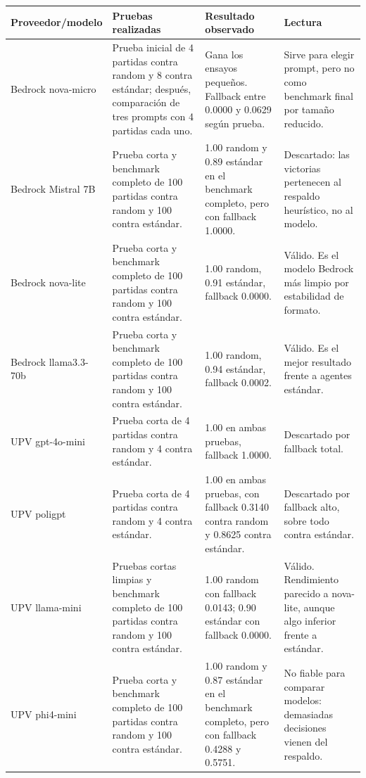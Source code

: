 ﻿\documentclass[10pt,a4paper]{article}
\renewcommand{\arraystretch}{1.08}
\begin{document}
\begin{table}[H]
\centering
\scriptsize
\renewcommand{\arraystretch}{1.16}
\setlength{\tabcolsep}{3pt}
\begin{tabular}{L{2.7cm}L{4.3cm}L{4.6cm}L{4.4cm}}
\toprule
Proveedor/modelo & Pruebas realizadas & Resultado observado & Lectura \\
\midrule
Bedrock nova-micro & Prueba inicial de 4 partidas contra random y 8 contra estándar; después, comparación de tres prompts con 4 partidas cada uno. & Gana los ensayos pequeños. Fallback entre 0.0000 y 0.0629 según prueba. & Sirve para elegir prompt, pero no como benchmark final por tamaño reducido. \\
\addlinespace[0.25em]
Bedrock Mistral 7B & Prueba corta y benchmark completo de 100 partidas contra random y 100 contra estándar. & 1.00 random y 0.89 estándar en el benchmark completo, pero con fallback 1.0000. & Descartado: las victorias pertenecen al respaldo heurístico, no al modelo. \\
\addlinespace[0.25em]
Bedrock nova-lite & Prueba corta y benchmark completo de 100 partidas contra random y 100 contra estándar. & 1.00 random, 0.91 estándar, fallback 0.0000. & Válido. Es el modelo Bedrock más limpio por estabilidad de formato. \\
\addlinespace[0.25em]
Bedrock llama3.3-70b & Prueba corta y benchmark completo de 100 partidas contra random y 100 contra estándar. & 1.00 random, 0.94 estándar, fallback 0.0002. & Válido. Es el mejor resultado frente a agentes estándar. \\
\addlinespace[0.25em]
UPV gpt-4o-mini & Prueba corta de 4 partidas contra random y 4 contra estándar. & 1.00 en ambas pruebas, fallback 1.0000. & Descartado por fallback total. \\
\addlinespace[0.25em]
UPV poligpt & Prueba corta de 4 partidas contra random y 4 contra estándar. & 1.00 en ambas pruebas, con fallback 0.3140 contra random y 0.8625 contra estándar. & Descartado por fallback alto, sobre todo contra estándar. \\
\addlinespace[0.25em]
UPV llama-mini & Pruebas cortas limpias y benchmark completo de 100 partidas contra random y 100 contra estándar. & 1.00 random con fallback 0.0143; 0.90 estándar con fallback 0.0000. & Válido. Rendimiento parecido a nova-lite, aunque algo inferior frente a estándar. \\
\addlinespace[0.25em]
UPV phi4-mini & Prueba corta y benchmark completo de 100 partidas contra random y 100 contra estándar. & 1.00 random y 0.87 estándar en el benchmark completo, pero con fallback 0.4288 y 0.5751. & No fiable para comparar modelos: demasiadas decisiones vienen del respaldo. \\

\end{tabular}
\end{table}
\end{document}

